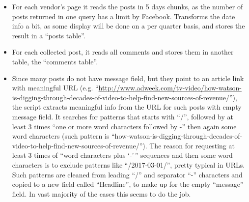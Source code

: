 \documentclass[]{article}
\newenvironment{Shaded}{\begin{snugshade}}{\end{snugshade}}
\newcommand{\KeywordTok}[1]{\textcolor[rgb]{0.13,0.29,0.53}{\textbf{{#1}}}}
\newcommand{\DataTypeTok}[1]{\textcolor[rgb]{0.13,0.29,0.53}{{#1}}}
\newcommand{\CharTok}[1]{\textcolor[rgb]{0.31,0.60,0.02}{{#1}}}
\newcommand{\StringTok}[1]{\textcolor[rgb]{0.31,0.60,0.02}{{#1}}}
\newcommand{\CommentTok}[1]{\textcolor[rgb]{0.56,0.35,0.01}{\textit{{#1}}}}
\newcommand{\NormalTok}[1]{{#1}}
\providecommand{\tightlist}{%
  \setlength{\itemsep}{0pt}\setlength{\parskip}{0pt}}
\begin{document}
\begin{itemize}
\tightlist
\item
  For each vendor's page it reads the posts in 5 days chunks, as the
  number of posts returned in one query has a limit by Facebook.
  Transforms the date info a bit, as some display will be done on a per
  quarter basis, and stores the result in a ``posts table''.
\item
  For each collected post, it reads all comments and stores them in
  another table, the ``comments table''.
\item
  Since many posts do not have message field, but they point to an
  article link with meaningful URL (e.g.
  ``\url{http://www.adweek.com/tv-video/how-watson-is-digging-through-decades-of-video-to-help-find-new-sources-of-revenue/}''),
  the script extracts meaningful info from the URL for such posts with
  empty message field. It searches for patterns that starts with ``/'',
  followed by at least 3 times ``one or more word characters followed by
  -'' then again some word characters (such pattern is
  ``how-watson-is-digging-through-decades-of-video-to-help-find-new-sources-of-revenue/'').
  The reason for requesting at least 3 times of ``word characters plus
  `-'\,'' sequences and then some word characters is to exclude patterns
  like ``/2017-03-01/'', pretty typical in URLs. Such patterns are
  cleaned from leading ``/'' and separator ``-'' characters and copied
  to a new field called ``Headline'', to make up for the empty
  ``message'' field. In vast majority of the cases this seems to do the
  job.
\end{itemize}

\begin{Shaded}
\end{Shaded}
\end{document}
